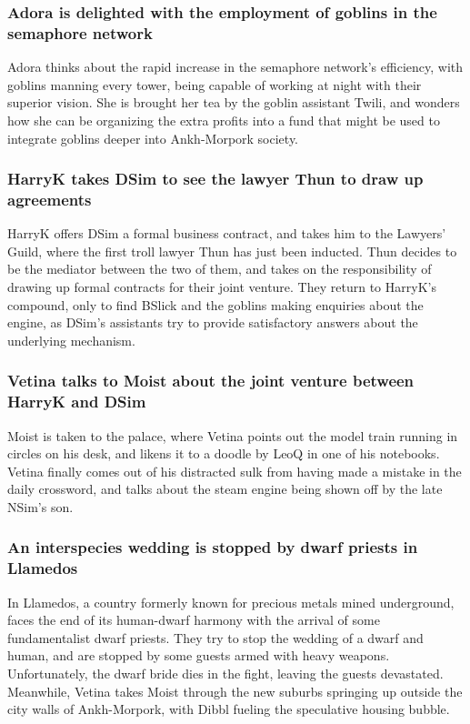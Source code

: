 \subsubsection{\Gls{Adora} is delighted with the employment of goblins in the semaphore network}
\Gls{Adora} thinks about the rapid increase in the semaphore network's efficiency, with goblins
manning every tower, being capable of working at night with their superior vision. She is brought
her tea by the goblin assistant \Gls{Twili}, and wonders how she can be organizing the extra
profits into a fund that might be used to integrate goblins deeper into Ankh-Morpork society.

\subsubsection{\Gls{HarryK} takes \Gls{DSim} to see the lawyer \Gls{Thun} to draw up agreements}
\Gls{HarryK} offers \Gls{DSim} a formal business contract, and takes him to the Lawyers' Guild,
where the first troll lawyer \Gls{Thun} has just been inducted. \Gls{Thun} decides to be the
mediator between the two of them, and takes on the responsibility of drawing up formal contracts
for their joint venture. They return to \Gls{HarryK}'s compound, only to find \Gls{BSlick} and the
goblins making enquiries about the engine, as \Gls{DSim}'s assistants try to provide satisfactory
answers about the underlying mechanism.

\subsubsection{\Gls{Vetina} talks to \Gls{Moist} about the joint venture between \Gls{HarryK} and
    \Gls{DSim}}
\Gls{Moist} is taken to the palace, where \Gls{Vetina} points out the model train running in
circles on his desk, and likens it to a doodle by \Gls{LeoQ} in one of his notebooks. \Gls{Vetina}
finally comes out of his distracted sulk from having made a mistake in the daily crossword, and
talks about the steam engine being shown off by the late \Gls{NSim}'s son.

\subsubsection{An interspecies wedding is stopped by dwarf priests in Llamedos}
In Llamedos, a country formerly known for precious metals mined underground, faces the end of its
human-dwarf harmony with the arrival of some fundamentalist dwarf priests. They try to stop the
wedding of a dwarf and human, and are stopped by some guests armed with heavy weapons.
Unfortunately, the dwarf bride dies in the fight, leaving the guests devastated. Meanwhile,
\Gls{Vetina} takes \Gls{Moist} through the new suburbs springing up outside the city walls of
Ankh-Morpork, with \Gls{Dibbl} fueling the speculative housing bubble.

